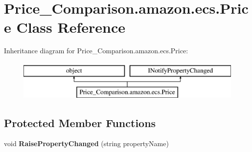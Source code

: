 \hypertarget{class_price___comparison_1_1amazon_1_1ecs_1_1_price}{\section{Price\-\_\-\-Comparison.\-amazon.\-ecs.\-Price Class Reference}
\label{class_price___comparison_1_1amazon_1_1ecs_1_1_price}
}


 


Inheritance diagram for Price\-\_\-\-Comparison.\-amazon.\-ecs.\-Price\-:\begin{figure}[H]
\begin{center}
\leavevmode
\includegraphics[height=2.000000cm]{class_price___comparison_1_1amazon_1_1ecs_1_1_price}
\end{center}
\end{figure}
\subsection*{Protected Member Functions}
\begin{DoxyCompactItemize}
\item 
\hypertarget{class_price___comparison_1_1amazon_1_1ecs_1_1_price_a7803848468611c1bdc0909e40b59e5ad}{void {\bfseries Raise\-Property\-Changed} (string property\-Name)}\label{class_price___comparison_1_1amazon_1_1ecs_1_1_price_a7803848468611c1bdc0909e40b59e5ad}

\end{DoxyCompactItemize}
